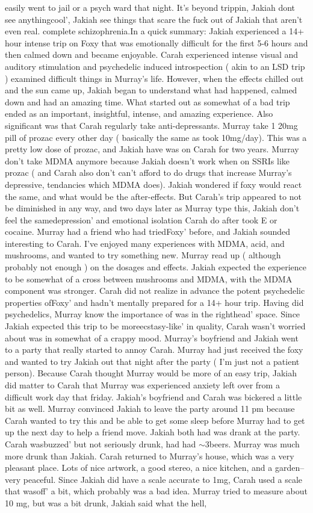 \documentclass[12pt]{book}
\begin{document}
easily went to jail or a psych ward that night. It's beyond trippin, Jakiah dont see anythingcool', Jakiah see things that scare the fuck out of Jakiah that aren't even real. complete schizophrenia.In a quick summary: Jakiah experienced a 14+ hour intense trip on Foxy that was emotionally difficult for the first 5-6 hours and then calmed down and became enjoyable. Carah experienced intense visual and auditory stimulation and psychedelic induced introspection ( akin to an LSD trip ) examined difficult things in Murray's life. However, when the effects chilled out and the sun came up, Jakiah began to understand what had happened, calmed down and had an amazing time. What started out as somewhat of a bad trip ended as an important, insightful, intense, and amazing experience. Also significant was that Carah regularly take anti-depressants. Murray take 1 20mg pill of prozac every other day ( basically the same as took 10mg/day). This was a pretty low dose of prozac, and Jakiah have was on Carah for two years. Murray don't take MDMA anymore because Jakiah doesn't work when on SSRIs like prozac ( and Carah also don't can't afford to do drugs that increase Murray's depressive, tendancies which MDMA does). Jakiah wondered if foxy would react the same, and what would be the after-effects. But Carah's trip appeared to not be diminished in any way, and two days later as Murray type this, Jakiah don't feel the samedepression' and emotional isolation Carah do after took E or cocaine. Murray had a friend who had triedFoxy' before, and Jakiah sounded interesting to Carah. I've enjoyed many experiences with MDMA, acid, and mushrooms, and wanted to try something new. Murray read up ( although probably not enough ) on the dosages and effects. Jakiah expected the experience to be somewhat of a cross between mushrooms and MDMA, with the MDMA component was stronger. Carah did not realize in advance the potent psychedelic properties ofFoxy' and hadn't mentally prepared for a 14+ hour trip. Having did psychedelics, Murray know the importance of was in the righthead' space. Since Jakiah expected this trip to be moreecstasy-like' in quality, Carah wasn't worried about was in somewhat of a crappy mood. Murray's boyfriend and Jakiah went to a party that really started to annoy Carah. Murray had just received the foxy and wanted to try Jakiah out that night after the party ( I'm just not a patient person). Because Carah thought Murray would be more of an easy trip, Jakiah did matter to Carah that Murray was experienced anxiety left over from a difficult work day that friday. Jakiah's boyfriend and Carah was bickered a little bit as well. Murray convinced Jakiah to leave the party around 11 pm because Carah wanted to try this and be able to get some sleep before Murray had to get up the next day to help a friend move. Jakiah both had was drank at the party. Carah wasbuzzed' but not seriously drunk, had had $\sim$3beers. Murray was much more drunk than Jakiah. Carah returned to Murray's house, which was a very pleasant place. Lots of nice artwork, a good stereo, a nice kitchen, and a garden--very peaceful. Since Jakiah did have a scale accurate to 1mg, Carah used a scale that wasoff' a bit, which probably was a bad idea. Murray tried to measure about 10 mg, but was a bit drunk, Jakiah said what the hell, 
\end{document}
